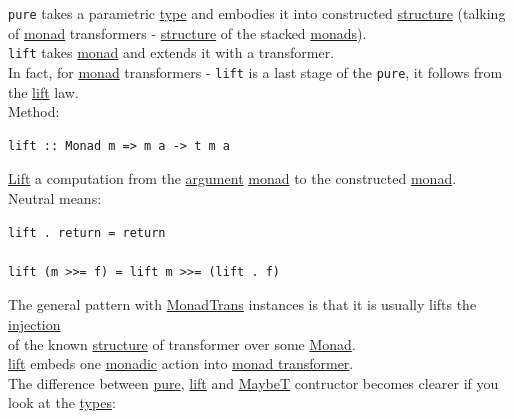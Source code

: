 \documentclass[a4paper,14pt,oneside]{book}
\begin{document}
\texttt{pure} takes a parametric \hyperref[org33d7e2e]{type} and embodies it into constructed \hyperref[org2f999c6]{structure} (talking of \hyperref[org27993ff]{monad} transformers - \hyperref[org2f999c6]{structure} of the stacked \hyperref[orgb4d8700]{monads}).\\

\texttt{lift} takes \hyperref[org27993ff]{monad} and extends it with a transformer.\\

In fact, for \hyperref[org27993ff]{monad} transformers - \texttt{lift} is a last stage of the \texttt{pure}, it follows from the \hyperref[org85fe484]{lift} law.\\

Method:\\
\begin{verbatim}
lift :: Monad m => m a -> t m a
\end{verbatim}
\hyperref[org85fe484]{Lift} a computation from the \hyperref[orgeeda40a]{argument} \hyperref[org27993ff]{monad} to the constructed \hyperref[org27993ff]{monad}.\\

Neutral means:\\
\begin{verbatim}
lift . return = return

lift (m >>= f) = lift m >>= (lift . f)
\end{verbatim}

The general pattern with \hyperref[org6e344be]{MonadTrans} instances is that it is usually lifts the \hyperref[orgd5ee862]{injection}\\
of the known \hyperref[org2f999c6]{structure} of transformer over some \hyperref[org27993ff]{Monad}.\\

\hyperref[org85fe484]{lift} embeds one \hyperref[org6161b39]{monadic} action into \hyperref[org9029a57]{monad transformer}.\\

The difference between \hyperref[org662733c]{pure}, \hyperref[org85fe484]{lift} and \hyperref[org22a0819]{MaybeT} contructor becomes clearer if you look at the \hyperref[org120e41a]{types}:\\
\end{document}
